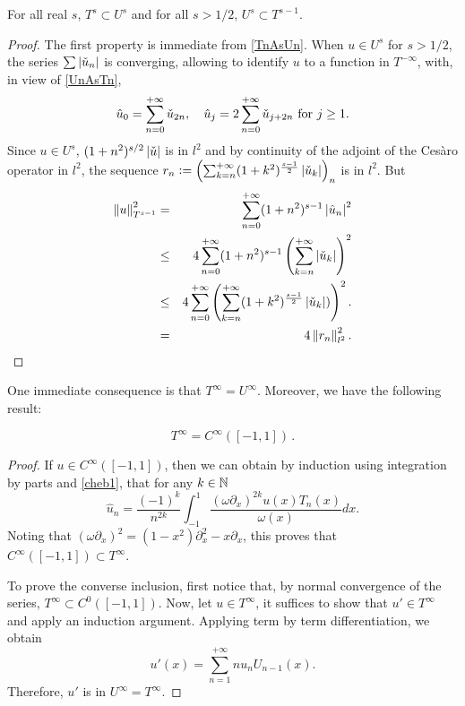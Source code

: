 \documentclass[a4paper]{article}
\begin{document}
\begin{Lem}
	\label{inclusionsTsUs}
	For all real $s$, $T^s \subset U^s$ and for all $s > 1/2$, $U^s \subset T^{s-1}$.
\end{Lem}
\begin{proof}
	The first property is immediate from \eqref{TnAsUn}. 
	When $u \in U^{s}$ for $s > 1/2$, the series $\sum \left\lvert \check{u}_n \right\rvert$ is converging, allowing to identify $u$ to a function in $T^{-\infty}$, with, in view of \eqref{UnAsTn}, 
	\[\hat{u}_{0} = \sum_{n=0}^{+ \infty} \check{u}_{2n}, \quad  \hat{u}_j = 2\sum_{n=0}^{+\infty} \check{u}_{j + 2n} \textup{ for } j \geq 1.\]
	Since $u \in U^s$, $(1+n^2)^{s/2} \left\lvert \check{u} \right\rvert$ is in $l^2$ and by continuity of the adjoint of the Cesàro operator in $l^2$, the sequence $r_n \mathrel{\mathop:}= \left( \sum_{k=n}^{+ \infty} (1+k^2)^{\frac{s-1}{2}} \left\lvert \check{u}_k \right\rvert\right)_n$ is in $l^2$. But
	\begin{eqnarray*}
		\left\|u\right\|_{T^{s-1}}^2 &=& \sum_{n=0}^{+ \infty} (1 + n^2)^{s-1} \left\lvert \hat{u}_n \right\rvert^2\\ 
		&\leq& 4\sum_{n=0}^{+\infty}(1+n^2)^{s-1} \left(\sum_{k=n}^{+\infty} \left\lvert \check{u}_k \right\rvert\right)^2 \\
		&\leq& 4\sum_{n=0}^{+ \infty}\left(\sum_{k=n}^{+\infty}(1+k^2)^{\frac{s-1}{2}} \left\lvert \check{u}_k \right\rvert)\right)^2.\\
		&=& 4\left\|r_n\right\|^2_{l^2}.
	\end{eqnarray*}	
\end{proof}
\noindent One immediate consequence is that $T^{\infty} = U^{\infty}$.  Moreover, we have the following result:
\begin{Lem}
	\[T^{\infty} = C^{\infty}([-1,1])\,.\]
	\label{LemTinfCinf}
\end{Lem}
\begin{proof}
	If $u \in C^{\infty}([-1,1])$, then we can obtain by induction using integration by parts and \eqref{cheb1}, that for any $k \in \mathbb{N}$
	\[\hat{u}_n = \frac{(-1)^k}{n^{2k}} \int_{-1}^{1} \dfrac{(\omega\partial_x)^{2k} u(x) T_n(x)}{\omega(x)}dx.\]
	Noting that $(\omega \partial_x)^2 = (1-x^2)\partial_x^2 - x \partial_ x$, this proves that $C^{\infty}([-1,1]) \subset T^{\infty}$. 
	
	To prove the converse inclusion, first notice that, by normal convergence of the series, $T^{\infty} \subset C^0([-1,1]) $. Now, let $u \in T^{\infty}$, it suffices to show that $u' \in T^{\infty}$ and apply an induction argument. Applying term by term differentiation, we obtain
	\[u'(x) = \sum_{n=1}^{+\infty} n u_n U_{n-1}(x).\] 
	Therefore, $u'$ is in $U^{\infty} = T^{\infty}$. 
\end{proof}
\end{document}

